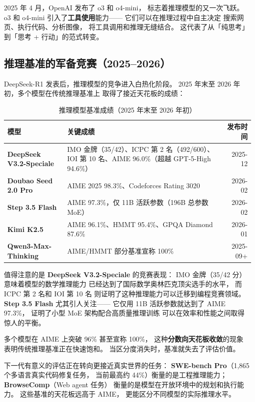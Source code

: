 2025 年 4 月，OpenAI 发布了 o3 和 o4-mini，
标志着推理模型的又一次飞跃。
o3 和 o4-mini 引入了\textbf{工具使用}能力——
它们可以在推理过程中自主决定
搜索网页、执行代码、分析图像，
将工具调用和推理无缝结合。
这代表了从「纯思考」到「思考 + 行动」的范式转变。

\subsection{推理基准的军备竞赛（2025--2026）}

DeepSeek-R1 发表后，推理模型的竞争进入白热化阶段。
2025 年末至 2026 年初，多个模型在传统推理基准上
取得了接近天花板的成绩：

\begin{table}[H]
\centering\small
\caption{推理模型基准成绩（2025 年末至 2026 年初）}
\begin{tabularx}{\linewidth}{l X r}
\toprule
\textbf{模型} & \textbf{关键成绩} & \textbf{发布时间} \\
\midrule
\textbf{DeepSeek V3.2-Speciale} &
  IMO 金牌（35/42）、ICPC 第 2 名（492/600）、IOI 第 10 名、AIME 96.0\%（超越 GPT-5-High 94.6\%） &
  2025-12 \\
\textbf{Doubao Seed 2.0 Pro} &
  AIME 2025 98.3\%、Codeforces Rating 3020 &
  2026-02 \\
\textbf{Step 3.5 Flash} &
  AIME 97.3\%，仅 11B 活跃参数（196B 总参数 MoE） &
  2026-02 \\
\textbf{Kimi K2.5} &
  AIME 96.1\%、HMMT 95.4\%、GPQA Diamond 87.6\% &
  2026-01 \\
\textbf{Qwen3-Max-Thinking} &
  AIME/HMMT 部分基准宣称 100\% &
  2025-09+ \\
\bottomrule
\end{tabularx}
\end{table}

值得注意的是 \textbf{DeepSeek V3.2-Speciale} 的竞赛表现：
IMO 金牌（35/42 分）意味着模型的数学推理能力
已经达到了国际数学奥林匹克顶尖选手的水平，
而 ICPC 第 2 名和 IOI 第 10 名
则证明了这种推理能力可以迁移到编程竞赛领域。
\textbf{Step 3.5 Flash} 尤其引人关注——
它仅用 11B 活跃参数就达到了 AIME 97.3\%，
证明了小型 MoE 架构配合高质量推理训练
可以在效率和性能之间取得惊人的平衡。

\begin{warnbox}[基准饱和与评估范式转移]
多个模型在 AIME 上突破 96\% 甚至宣称 100\%，
这种\textbf{分数向天花板收敛}的现象
表明传统推理基准正在快速饱和。
当区分度消失时，基准就失去了评估价值。

下一代有意义的评估正在转向更接近真实世界的任务：
\textbf{SWE-bench Pro}（1,865 个多语言真实代码修复任务，
当前最高约 44\%）衡量的是工程推理能力；
\textbf{BrowseComp}（Web agent 任务）
衡量的是模型在开放环境中的规划和执行能力。
这些基准的天花板远高于 AIME，
更能区分不同模型的实际推理水平。
\end{warnbox}


